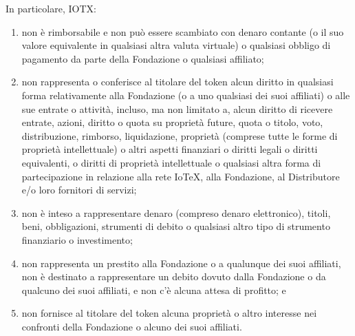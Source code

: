 In particolare, IOTX:

\begin{enumerate}[label=(\alph*)]
    \item non è rimborsabile e non può essere scambiato con denaro contante (o il suo valore equivalente in qualsiasi altra valuta virtuale) o qualsiasi obbligo di pagamento da parte della Fondazione o qualsiasi affiliato;

    \item non rappresenta o conferisce al titolare del token alcun diritto in qualsiasi forma relativamente alla Fondazione (o a uno qualsiasi dei suoi affiliati) o alle sue entrate o attività, incluso, ma non limitato a, alcun diritto di ricevere entrate, azioni, diritto o quota su proprietà future, quota o titolo, voto, distribuzione, rimborso, liquidazione, proprietà (comprese tutte le forme di proprietà intellettuale) o altri aspetti finanziari
    o diritti legali o diritti equivalenti, o diritti di proprietà intellettuale o qualsiasi altra forma di partecipazione in relazione alla rete IoTeX, alla Fondazione, al Distributore e/o loro fornitori di servizi;

    \item non è inteso a rappresentare denaro (compreso denaro elettronico), titoli, beni, obbligazioni, strumenti di debito o qualsiasi altro tipo di strumento finanziario o investimento;

    \item non rappresenta un prestito alla Fondazione o a qualunque dei suoi affiliati, non è destinato a rappresentare un debito dovuto dalla Fondazione o da qualcuno dei suoi affiliati, e non c'è alcuna attesa di profitto; e

    \item non fornisce al titolare del token alcuna proprietà o altro interesse nei confronti della Fondazione o alcuno dei suoi affiliati.
\end{enumerate}
